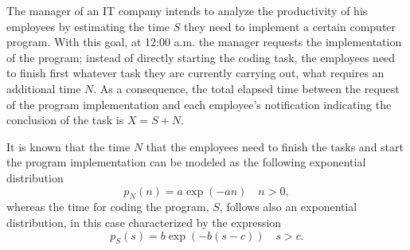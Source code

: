 \begin{solution}
\end{solution}

\else

\question The manager of an IT company intends to analyze the productivity of his employees by estimating the time $S$ they need to implement a certain computer program. With this goal, at 12:00 a.m. the manager requests the implementation of the program; instead of directly starting the coding task, the employees need to finish first whatever task they are currently carrying out, what requires an additional time $N$. As a consequence, the total elapsed time between the request of the program implementation and each employee's notification indicating the conclusion of the task is $X=S+N$.

It is known that the time $N$ that the employees need to finish the tasks and start the program implementation can be modeled as the following exponential distribution
$$p_{N}(n) = a \exp \left(-a n \right)  \quad n>0,$$
whereas the time for coding the program, $S$, follows also an exponential distribution, in this case characterized by the expression
$$p_{S}(s) = b \exp \left(-b  \left(s-c \right)    \right)  \quad s>c.$$

